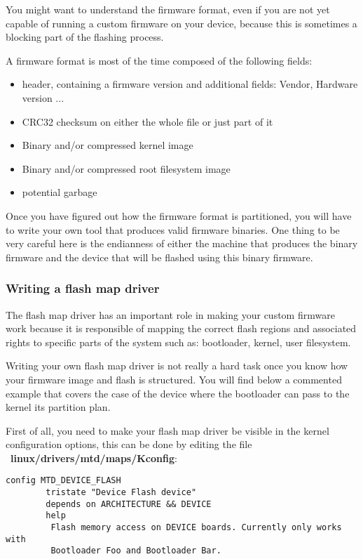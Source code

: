You might want to understand the firmware format, even if you are not yet capable
of running a custom firmware on your device, because this is sometimes a blocking
part of the flashing process.

A firmware format is most of the time composed of the following fields:

\begin{itemize}
\item header, containing a firmware version and additional fields: Vendor, Hardware version ...
\item CRC32 checksum on either the whole file or just part of it
\item Binary and/or compressed kernel image
\item Binary and/or compressed root filesystem image
\item potential garbage
\end{itemize}

Once you have figured out how the firmware format is partitioned, you will have 
to write your own tool that produces valid firmware binaries. One thing to be very
careful here is the endianness of either the machine that produces the binary 
firmware and the device that will be flashed using this binary firmware.

\subsubsection{Writing a flash map driver}

The flash map driver has an important role in making your custom firmware work 
because it is responsible of mapping the correct flash regions and associated 
rights to specific parts of the system such as: bootloader, kernel, user filesystem.

Writing your own flash map driver is not really a hard task once you know how your
firmware image and flash is structured. You will find below a commented example
that covers the case of the device where the bootloader can pass to the kernel its partition plan.

First of all, you need to make your flash map driver be visible in the kernel 
configuration options, this can be done by editing the file \
\textbf{linux/drivers/mtd/maps/Kconfig}:

\begin{verbatim}
config MTD_DEVICE_FLASH
        tristate "Device Flash device"
        depends on ARCHITECTURE && DEVICE
        help
         Flash memory access on DEVICE boards. Currently only works with
         Bootloader Foo and Bootloader Bar.
\end{verbatim}

